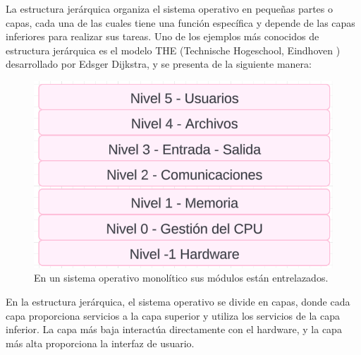 La estructura jerárquica organiza el sistema operativo en pequeñas partes o capas, cada una de las cuales tiene una función específica y depende de las capas inferiores para realizar sus tareas.
Uno de los ejemplos más conocidos de estructura jerárquica es el modelo THE (Technische Hogeschool, Eindhoven  ) desarrollado por Edsger Dijkstra, y se presenta de la siguiente manera:
\begin{figure}[H]
	\centering
	\includegraphics[width=0.6\linewidth]{Imagenes/jerarquico.png}
	\caption{En un sistema operativo monolítico sus módulos están entrelazados. }
	\label{fig:enter-label}
\end{figure}



En la estructura jerárquica, el sistema operativo se divide en capas, donde cada capa proporciona servicios a la capa superior y utiliza los servicios de la capa inferior. La capa más baja interactúa directamente con el hardware, y la capa más alta proporciona la interfaz de usuario.

